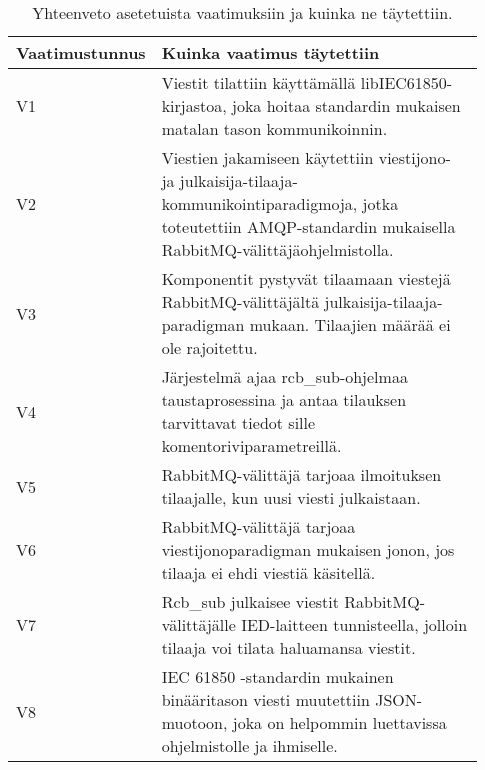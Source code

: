 \begin{table}[ht!]
	\caption{Yhteenveto asetetuista vaatimuksiin ja kuinka ne täytettiin.}
	\label{tab:requirements-met}
	\begin{tabular}{p{0.11\linewidth} | p{0.82\linewidth}}
		\hline
		\textbf{Vaatimus\-tunnus} & \textbf{Kuinka vaatimus täytettiin} \\
		\hline
		V1 & Viestit tilattiin käyttämällä libIEC61850-kirjastoa, joka hoitaa standardin mukaisen matalan tason kommunikoinnin. \\
		\hline
		V2 & Viestien jakamiseen käytettiin viestijono- ja julkaisija-tilaaja-kommunikointiparadigmoja, jotka toteutettiin AMQP-standardin mukaisella RabbitMQ-välittäjäohjelmistolla. \\
		\hline
		V3 & Komponentit pystyvät tilaamaan viestejä RabbitMQ-välittäjältä julkaisija-tilaaja-paradigman mukaan. Tilaajien määrää ei ole rajoitettu. \\
		\hline
		V4 & Järjestelmä ajaa rcb\_sub-ohjelmaa taustaprosessina ja antaa tilauksen tarvittavat tiedot sille komentoriviparametreillä. \\
		\hline
		V5 & RabbitMQ-välittäjä tarjoaa ilmoituksen tilaajalle, kun uusi viesti julkaistaan. \\
		\hline
		V6 & RabbitMQ-välittäjä tarjoaa viestijonoparadigman mukaisen jonon, jos tilaaja ei ehdi viestiä käsitellä. \\
		\hline
		V7 & Rcb\_sub julkaisee viestit RabbitMQ-välittäjälle IED-laitteen tunnisteella, jolloin tilaaja voi tilata haluamansa viestit. \\
		\hline
		V8 & IEC 61850 -standardin mukainen binääritason viesti muutettiin JSON-muotoon, joka on helpommin luettavissa ohjelmistolle ja ihmiselle. \\
		\hline

\end{tabular}
\end{table}
